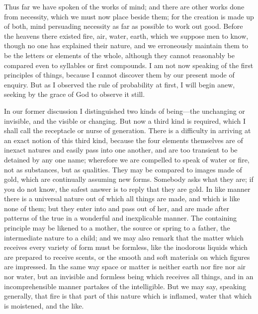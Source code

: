 \documentclass[11pt,letter]{article}
\begin{document}
\par  Thus far we have spoken of the works of mind; and there are other works done from necessity, which we must now place beside them; for the creation is made up of both, mind persuading necessity as far as possible to work out good. Before the heavens there existed fire, air, water, earth, which we suppose men to know, though no one has explained their nature, and we erroneously maintain them to be the letters or elements of the whole, although they cannot reasonably be compared even to syllables or first compounds. I am not now speaking of the first principles of things, because I cannot discover them by our present mode of enquiry. But as I observed the rule of probability at first, I will begin anew, seeking by the grace of God to observe it still.

\par  In our former discussion I distinguished two kinds of being—the unchanging or invisible, and the visible or changing. But now a third kind is required, which I shall call the receptacle or nurse of generation. There is a difficulty in arriving at an exact notion of this third kind, because the four elements themselves are of inexact natures and easily pass into one another, and are too transient to be detained by any one name; wherefore we are compelled to speak of water or fire, not as substances, but as qualities. They may be compared to images made of gold, which are continually assuming new forms. Somebody asks what they are; if you do not know, the safest answer is to reply that they are gold. In like manner there is a universal nature out of which all things are made, and which is like none of them; but they enter into and pass out of her, and are made after patterns of the true in a wonderful and inexplicable manner. The containing principle may be likened to a mother, the source or spring to a father, the intermediate nature to a child; and we may also remark that the matter which receives every variety of form must be formless, like the inodorous liquids which are prepared to receive scents, or the smooth and soft materials on which figures are impressed. In the same way space or matter is neither earth nor fire nor air nor water, but an invisible and formless being which receives all things, and in an incomprehensible manner partakes of the intelligible. But we may say, speaking generally, that fire is that part of this nature which is inflamed, water that which is moistened, and the like.
\end{document}
